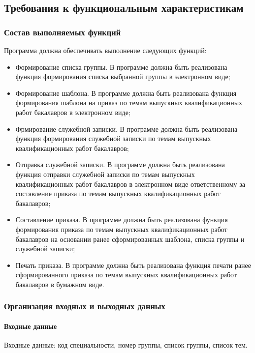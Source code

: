 \documentclass[utf8x]{article}
\begin{document}
\begin{flushleft}
\subsection{Требования к функциональным характеристикам}
\subsubsection{Состав выполняемых функций}
Программа должна обеспечивать выполнение следующих функций:

\begin{itemize}

\item Формирование списка группы. В программе должна быть реализована функция формирования списка выбранной группы в электронном виде;
\item Формирование шаблона. В программе должна быть реализована функция формирования шаблона на приказ по темам выпускных квалификационных работ бакалавров в электронном виде;
\item Фрмирование служебной записки. В программе должна быть реализована функция формирования служебной записки по темам выпускных квалификационных работ бакалавров;
\item Отправка служебной записки. В программе должна быть реализована функция отправки служебной записки по темам выпускных квалификационных работ бакалавров в электронном виде ответственному за составление приказа по темам выпускных квалификационных работ бакалавров;
\item Составление приказа. В программе должна быть реализована функция формирования приказа по темам выпускных квалификационных работ бакалавров на основании ранее сформированных шаблона, списка группы и служебной записки; 
\item Печать приказа. В программе должна быть реализована функция печати ранее сформированного приказа по темам выпускных квалификационных работ бакалавров в бумажном виде.
\end{itemize}

\subsubsection{Организация входных и выходных данных}

\paragraph{Входные данные}
Входные данные: код специальности, номер группы, список группы, список тем.

\end{flushleft}
\end{document}
